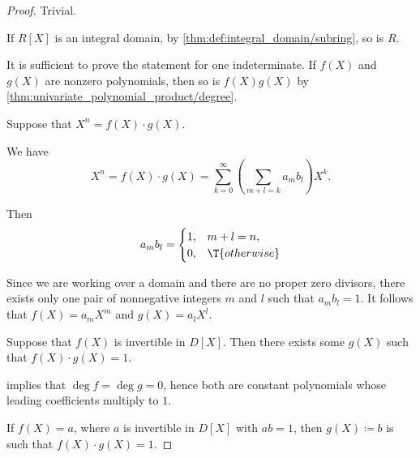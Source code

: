 \begin{proof}
   Trivial.


  \NecessitySubProof* If \( R[X] \) is an integral domain, by \cref{thm:def:integral_domain/subring}, so is \( R \).

  \SufficiencySubProof* It is sufficient to prove the statement for one indeterminate. If \( f(X) \) and \( g(X) \) are nonzero polynomials, then so is \( f(X) g(X) \) by \cref{thm:univariate_polynomial_product/degree}.

   Suppose that \( X^n = f(X) \cdot g(X) \).

  We have
  \begin{equation*}
    X^n
    =
    f(X) \cdot g(X)
    =
    \sum_{k=0}^\infty (\sum_{m+l=k} a_m b_l) X^k.
  \end{equation*}

  Then
  \begin{equation*}
    a_m b_l = \begin{cases}
      1, &m + l = n, \\
      0, &\T{otherwise}
    \end{cases}
  \end{equation*}

  Since we are working over a domain and there are no proper zero divisors, there exists only one pair of nonnegative integers \( m \) and \( l \) such that \( a_m b_l = 1 \). It follows that \( f(X) = a_m X^m \) and \( g(X) = a_l X^l \).

  \SufficiencySubProof* Suppose that \( f(X) \) is invertible in \( D[X] \). Then there exists some \( g(X) \) such that \( f(X) \cdot g(X) = 1 \).

   implies that \( \deg f = \deg g = 0 \), hence both are constant polynomials whose leading coefficients multiply to \( 1 \).

  \NecessitySubProof* If \( f(X) = a \), where \( a \) is invertible in \( D[X] \) with \( ab = 1 \), then \( g(X) \coloneqq b \) is such that \( f(X) \cdot g(X) = 1 \).
\end{proof}

